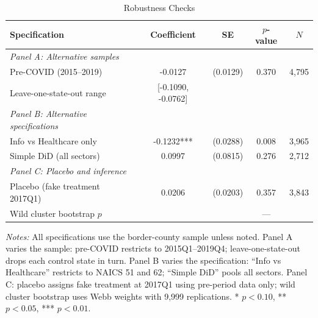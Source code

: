\begin{table}[H]
\centering
\caption{Robustness Checks}
\label{tab:robust}
\begin{threeparttable}
\begin{tabular}{lcccc}
\toprule
Specification & Coefficient & SE & $p$-value & $N$ \\
\midrule
\textit{Panel A: Alternative samples} & & & & \\
Pre-COVID (2015--2019) & -0.0127 & (0.0129) & 0.370 & 4,795 \\
Leave-one-state-out range & [-0.1090, -0.0762] & & & \\
\midrule
\textit{Panel B: Alternative specifications} & & & & \\
Info vs Healthcare only & -0.1232*** & (0.0288) & 0.008 & 3,965 \\
Simple DiD (all sectors) & 0.0997 & (0.0815) & 0.276 & 2,712 \\
\midrule
\textit{Panel C: Placebo and inference} & & & & \\
Placebo (fake treatment 2017Q1) & 0.0206 & (0.0203) & 0.357 & 3,843 \\
Wild cluster bootstrap $p$ & & & --- & \\
\bottomrule
\end{tabular}
\begin{tablenotes}[flushleft]
\small
\item \textit{Notes:} All specifications use the border-county sample unless noted. Panel A varies the sample: pre-COVID restricts to 2015Q1--2019Q4; leave-one-state-out drops each control state in turn. Panel B varies the specification: ``Info vs Healthcare'' restricts to NAICS 51 and 62; ``Simple DiD'' pools all sectors. Panel C: placebo assigns fake treatment at 2017Q1 using pre-period data only; wild cluster bootstrap uses Webb weights with 9,999 replications. * $p<0.10$, ** $p<0.05$, *** $p<0.01$.
\end{tablenotes}
\end{threeparttable}
\end{table}

